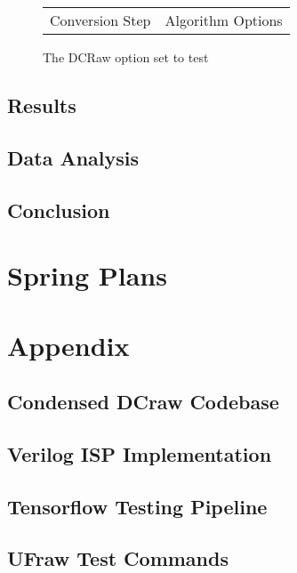 \documentclass{report}
\begin{document}
		\begin{figure}
			\begin{center}
				\label{condenseddcraw}
				\caption{The DCRaw option set to test}
				\begin{tabular}{ll}
					Conversion Step & Algorithm Options \\
				\end{tabular}
					
			\end{center}
		\end{figure}
		
	\section{Results}
	\section{Data Analysis}
	\section{Conclusion}

\chapter{Spring Plans}

\chapter{Appendix}

\section{Condensed DCraw Codebase}

\section{Verilog ISP Implementation}

\section{Tensorflow Testing Pipeline} \label{pipelinecode}

\section{UFraw Test Commands} \label{ufrawcommands}
\end{document}
